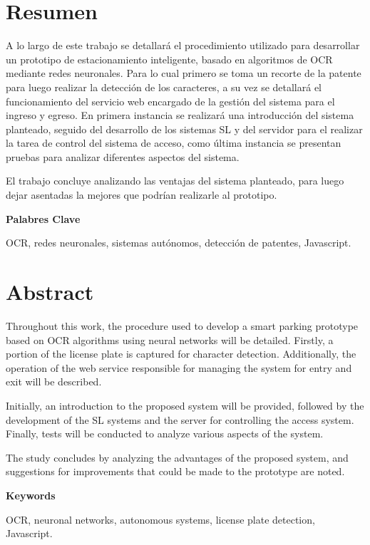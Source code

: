 \chapter*{Resumen}
A lo largo de este trabajo se detallará el procedimiento utilizado para desarrollar un prototipo de estacionamiento inteligente, basado en algoritmos de OCR mediante redes neuronales. Para lo cual primero se toma un recorte de la patente para luego realizar la detección de los caracteres, a su vez se detallará el funcionamiento del servicio web encargado de la gestión del sistema para el ingreso y egreso.
En primera instancia se realizará una introducción del sistema planteado, seguido del desarrollo de los sistemas SL y  del servidor para el realizar la tarea de control del sistema de acceso, como última instancia se presentan pruebas para analizar diferentes aspectos del sistema.

El trabajo concluye analizando las ventajas del sistema planteado, para luego dejar asentadas la mejores que podrían realizarle al prototipo.



\vspace*{\fill}
\noindent \textbf{Palabres Clave}

OCR, redes neuronales, sistemas autónomos, detección de patentes, Javascript.

\chapter*{Abstract}
Throughout this work, the procedure used to develop a smart parking prototype based on OCR algorithms using neural networks will be detailed. Firstly, a portion of the license plate is captured for character detection. Additionally, the operation of the web service responsible for managing the system for entry and exit will be described.

Initially, an introduction to the proposed system will be provided, followed by the development of the SL systems and the server for controlling the access system. Finally, tests will be conducted to analyze various aspects of the system.

The study concludes by analyzing the advantages of the proposed system, and suggestions for improvements that could be made to the prototype are noted.

\vspace*{\fill}
\noindent
\textbf{Keywords}

OCR, neuronal networks, autonomous systems, license plate detection, Javascript.